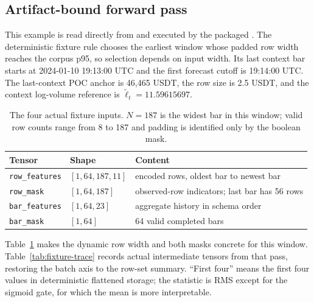 \documentclass[10pt]{article}
\begin{document}
\subsection{Artifact-bound forward pass}

This example is read directly from  and executed by the packaged
. The deterministic fixture rule chooses the earliest window whose padded
row width reaches the corpus p95, so selection depends on input width. Its last context bar starts at
2024-01-10 19:13:00 UTC and the first forecast cutoff is 19:14:00 UTC. The last-context POC anchor is
46,465 USDT, the row size is 2.5 USDT, and the context log-volume reference is
$\widetilde\ell_t=11.59615697$.

\begin{table}[H]
\centering
\small
\caption{The four actual fixture inputs. $N=187$ is the widest bar in this window; valid row counts
range from 8 to 187 and padding is identified only by the boolean mask.}
\label{tab:fixture-inputs}
\begin{tabular}{@{}lll@{}}
\toprule
Tensor & Shape & Content \\
\midrule
\texttt{row\_features} & $[1,64,187,11]$ & encoded rows, oldest bar to newest bar \\
\texttt{row\_mask} & $[1,64,187]$ & observed-row indicators; last bar has 56 rows \\
\texttt{bar\_features} & $[1,64,23]$ & aggregate history in schema order \\
\texttt{bar\_mask} & $[1,64]$ & 64 valid completed bars \\
\bottomrule
\end{tabular}
\end{table}

Table~\ref{tab:fixture-inputs} makes the dynamic row width and both masks concrete for this window.
Table~\ref{tab:fixture-trace} records actual intermediate tensors from that pass, restoring the batch
axis to the row-set summary. ``First four'' means the first four values in deterministic flattened
storage; the statistic is RMS except for the sigmoid gate, for which the mean is more interpretable.
\end{document}
